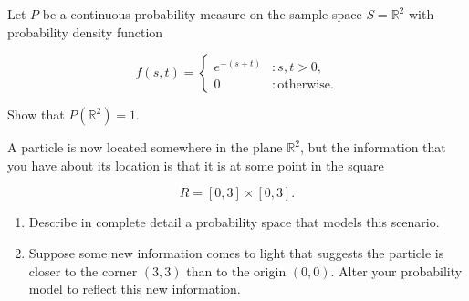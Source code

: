 \documentclass[12pt,reqno]{amsart}
\begin{document}
\prob Let $P$ be a continuous probability measure on the sample space $S=\mathbb{R}^2$ with probability density function

	\[
	f(s,t) = \begin{cases}
	e^{-(s+t)} & : s,t >0, \\
	0 & : \text{otherwise}.    
	\end{cases}
	\]

Show that $P(\mathbb{R}^2)=1$.\vfill

















\newpage
\prob A particle is now located somewhere in the plane $\mathbb{R}^2$, but the  information that you have about its location is that it is at some point in the square

	\[
	R = [0,3] \times [0,3].
	\]

\medskip
\begin{enumerate}
\item Describe in complete detail a probability space that models this scenario.\vfill
\item Suppose some new information comes to light that suggests the particle is closer to the corner $(3,3)$ than to the origin $(0,0)$. Alter your probability model to reflect this new information.\vfill
\end{enumerate}
    
   
\end{document}
